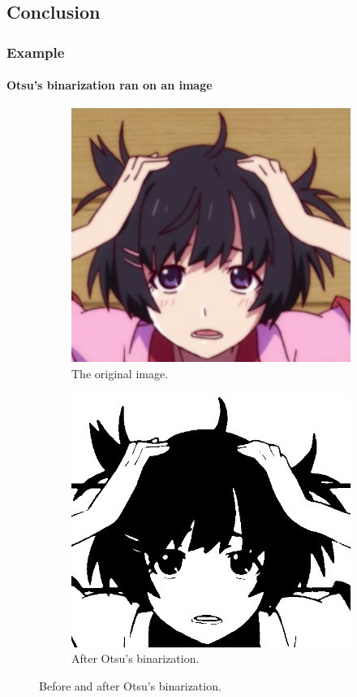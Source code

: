 \documentclass{beamer}                             %
\begin{document}
\subsection{Conclusion}

\begin{frame}
\frametitle{Example}
\framesubtitle{Otsu's binarization ran on an image}
\begin{figure}[h!]
    \centering
    \begin{subfigure}[h]{0.49 \textwidth}
      \includegraphics[scale=0.23]{hanekawa}
      \caption{The original image.}
    \end{subfigure}
    \hfill
    \begin{subfigure}[h]{0.49 \textwidth}
      \includegraphics[scale=0.23]{hanekawa_binary}
      \caption{After Otsu's binarization.}
    \end{subfigure}
    \caption{Before and after Otsu's binarization.}
\end{figure}
\end{frame}
\end{document}
